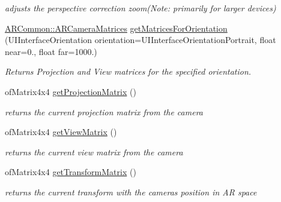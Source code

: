 \begin{DoxyCompactItemize}
\begin{DoxyCompactList}\small\item\em adjusts the perspective correction zoom(\+Note\+: primarily for larger devices) \end{DoxyCompactList}\item 
\mbox{\label{class_a_r_core_1_1_a_r_cam_aac1013569d47bc31f698680eef09a4f5}} 
\hyperlink{struct_a_r_common_1_1_a_r_camera_matrices}{A\+R\+Common\+::\+A\+R\+Camera\+Matrices} \hyperlink{class_a_r_core_1_1_a_r_cam_aac1013569d47bc31f698680eef09a4f5}{get\+Matrices\+For\+Orientation} (U\+I\+Interface\+Orientation orientation=U\+I\+Interface\+Orientation\+Portrait, float near=0., float far=1000.)
\begin{DoxyCompactList}\small\item\em Returns Projection and View matrices for the specified orientation. \end{DoxyCompactList}\item 
\mbox{\label{class_a_r_core_1_1_a_r_cam_a19409c89b0bcbaad62e5d405d194f8a7}} 
of\+Matrix4x4 \hyperlink{class_a_r_core_1_1_a_r_cam_a19409c89b0bcbaad62e5d405d194f8a7}{get\+Projection\+Matrix} ()
\begin{DoxyCompactList}\small\item\em returns the current projection matrix from the camera \end{DoxyCompactList}\item 
\mbox{\label{class_a_r_core_1_1_a_r_cam_a7ca28300844875464c7821620665d3b5}} 
of\+Matrix4x4 \hyperlink{class_a_r_core_1_1_a_r_cam_a7ca28300844875464c7821620665d3b5}{get\+View\+Matrix} ()
\begin{DoxyCompactList}\small\item\em returns the current view matrix from the camera \end{DoxyCompactList}\item 
\mbox{\label{class_a_r_core_1_1_a_r_cam_a280c37d6b4aa16169637cf3f5332c9d3}} 
of\+Matrix4x4 \hyperlink{class_a_r_core_1_1_a_r_cam_a280c37d6b4aa16169637cf3f5332c9d3}{get\+Transform\+Matrix} ()
\begin{DoxyCompactList}\small\item\em returns the current transform with the camera\textquotesingle{}s position in AR space \end{DoxyCompactList}\item 

\end{DoxyCompactItemize}
